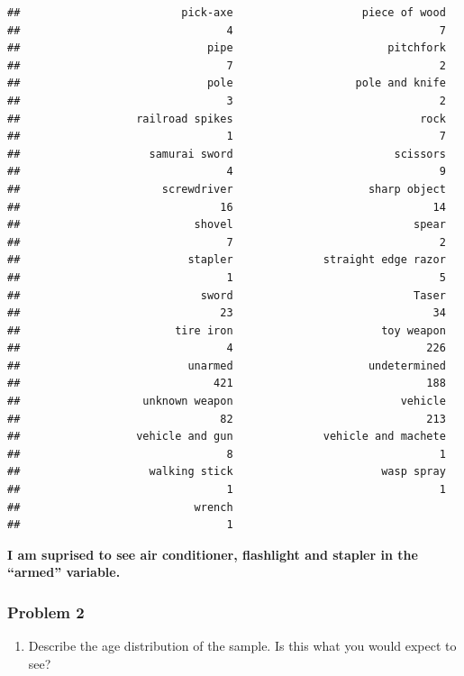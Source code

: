 \documentclass[
]{article}
\providecommand{\tightlist}{%
  \setlength{\itemsep}{0pt}\setlength{\parskip}{0pt}}
\begin{document}
\begin{verbatim}
##                         pick-axe                    piece of wood 
##                                4                                7 
##                             pipe                        pitchfork 
##                                7                                2 
##                             pole                   pole and knife 
##                                3                                2 
##                  railroad spikes                             rock 
##                                1                                7 
##                    samurai sword                         scissors 
##                                4                                9 
##                      screwdriver                     sharp object 
##                               16                               14 
##                           shovel                            spear 
##                                7                                2 
##                          stapler              straight edge razor 
##                                1                                5 
##                            sword                            Taser 
##                               23                               34 
##                        tire iron                       toy weapon 
##                                4                              226 
##                          unarmed                     undetermined 
##                              421                              188 
##                   unknown weapon                          vehicle 
##                               82                              213 
##                  vehicle and gun              vehicle and machete 
##                                8                                1 
##                    walking stick                       wasp spray 
##                                1                                1 
##                           wrench 
##                                1
\end{verbatim}

\textbf{I am suprised to see air conditioner, flashlight and stapler in
the ``armed'' variable.}

\hypertarget{problem-2-2}{%
\subsubsection{Problem 2}\label{problem-2-2}}

\begin{enumerate}
\def\labelenumi{\alph{enumi}.}
\tightlist
\item
  Describe the age distribution of the sample. Is this what you would
  expect to see?
\end{enumerate}
\end{document}
